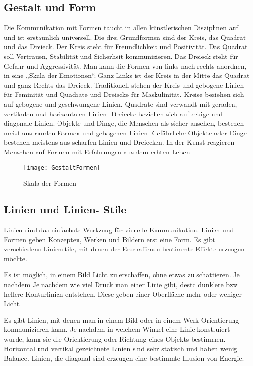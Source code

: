 \subsection{Gestalt und Form}
Die Kommunikation mit Formen taucht in allen künstlerischen Disziplinen auf und ist erstaunlich universell. Die drei Grundformen sind der Kreis, das Quadrat und das Dreieck. Der Kreis steht für Freundlichkeit und Positivität. Das Quadrat soll Vertrauen, Stabilität und Sicherheit kommunizieren. Das Dreieck steht für Gefahr und Aggressivität. Man kann die Formen von links nach rechts anordnen, in eine „Skala der Emotionen“. Ganz Links ist der Kreis in der Mitte das Quadrat und ganz Rechts das Dreieck. Traditionell stehen der Kreis und gebogene Linien für Feminität und Quadrate und Dreiecke für Maskulinität.
Kreise beziehen sich auf gebogene und geschwungene Linien. Quadrate sind verwandt mit geraden, vertikalen und horizontalen Linien. Dreiecke beziehen sich auf eckige und diagonale Linien. 
Objekte und Dinge, die Menschen als sicher ansehen, bestehen meist aus runden Formen und gebogenen Linien. Gefährliche Objekte oder Dinge bestehen meistens aus scharfen Linien und Dreiecken. In der Kunst reagieren Menschen auf Formen mit Erfahrungen aus dem echten Leben.
\cite{_drawing_basics_and_video_game_art}

\begin{figure}[H]
	\centering
	\texttt{[image: GestaltFormen]}
	\caption{Skala der Formen\cite{_drawing_basics_and_video_game_art}}
\end{figure}

\subsection{Linien und Linien- Stile}
Linien sind das einfachste Werkzeug für visuelle Kommunikation. Linien und Formen geben Konzepten, Werken und Bildern erst eine Form. Es gibt verschiedene Linienstile, mit denen der Erschaffende bestimmte Effekte erzeugen möchte. 
\cite{_drawing_basics_and_video_game_art}
\cite{_line_color_form}

Es ist möglich, in einem Bild Licht zu erschaffen, ohne etwas zu schattieren. Je nachdem Je nachdem wie viel Druck man einer Linie gibt, desto dunklere bzw hellere Konturlinien entstehen. Diese geben einer Oberfläche mehr oder weniger Licht. 
\cite{_drawing_basics_and_video_game_art}
\cite{_line_color_form}

Es gibt Linien, mit denen man in einem Bild oder in einem Werk Orientierung kommunizieren kann. Je nachdem in welchem Winkel eine Linie konstruiert wurde, kann sie die Orientierung oder Richtung eines Objekts bestimmen. Horizontal und vertikal gezeichnete Linien sind sehr statisch und haben wenig Balance. Linien, die diagonal sind erzeugen eine bestimmte Illusion von Energie.
\cite{_drawing_basics_and_video_game_art}

